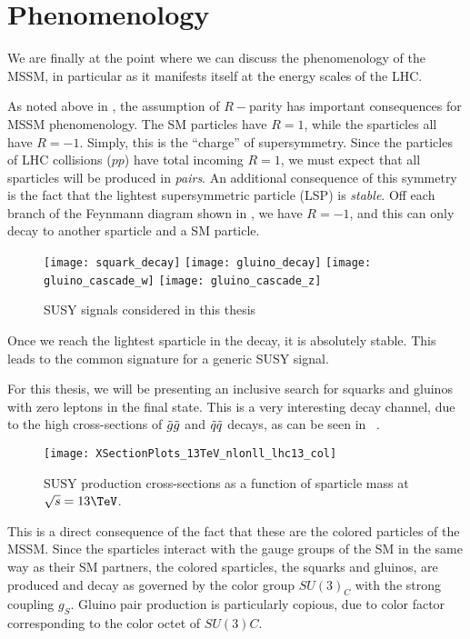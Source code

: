 \section{Phenomenology}

We are finally at the point where we can discuss the phenomenology of the MSSM, in particular as it manifests itself at the energy scales of the LHC.

As noted above in , the assumption of $R-$parity has important consequences for MSSM phenomenology.
The SM particles have $R=1$, while the sparticles all have $R=-1$.
Simply, this is the ``charge'' of supersymmetry.
Since the particles of LHC collisions ($pp$) have total incoming $R=1$, we must expect that all sparticles will be produced in \textit{pairs}.
An additional consequence of this symmetry is the fact that the lightest supersymmetric particle (LSP)  is \textit{stable}.
Off each branch of the Feynmann diagram shown in , we have $R=-1$, and this can only decay to another sparticle and a SM particle.
\begin{figure}
\caption{SUSY signals considered in this thesis}\label{fig:signal_feynmann}
\texttt{[image: squark\_decay]}
\texttt{[image: gluino\_decay]}
\texttt{[image: gluino\_cascade\_w]}
\texttt{[image: gluino\_cascade\_z]}
\end{figure}
Once we reach the lightest sparticle in the decay, it is absolutely stable.
This leads to the common signature \met for a generic SUSY signal.

For this thesis, we will be presenting an inclusive search for squarks and gluinos with zero leptons in the final state.
This is a very interesting decay channel, due to the high cross-sections of $\tilde{g} \tilde{g}$ and $\tilde{q} \tilde{q}$ decays, as can be seen in  ~\cite{Borschensky:2014cia}.

\begin{figure}\label{fig:susy_xsec}
\caption{SUSY production cross-sections as a function of sparticle mass at $\sqrt{s} = 13 \TeV$.}
\texttt{[image: XSectionPlots\_13TeV\_nlonll\_lhc13\_col]}
\end{figure}
This is a direct consequence of the fact that these are the colored particles of the MSSM.
Since the sparticles interact with the gauge groups of the SM in the same way as their SM partners, the colored sparticles, the squarks and gluinos, are produced and decay as governed by the color group $SU(3)_C$ with the strong coupling $g_S$.
Gluino pair production is particularly copious, due to color factor corresponding to the color octet of $SU(3)C$.

